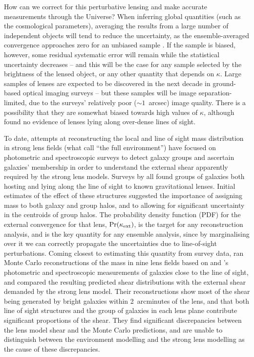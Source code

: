 \documentclass[useAMS,usenatbib]{mn2e}
\begin{document}
How can we correct for this perturbative lensing and make
accurate measurements through the Universe? When inferring global quantities
(such as the cosmological parameters), averaging the results from a large
number of independent objects will tend to reduce the uncertainty, as the
ensemble-averaged convergence approaches zero for an unbiased sample
\citep[\eg][]{Linder+Holz2004}. If the sample is biased, however, some
residual systematic error will remain while the statistical uncertainty
decreases -- and this will be the case for any sample selected by the
brightness of the lensed object, or any other quantity that depends on
$\kappa$. Large
samples of lenses are expected to be discovered in the next decade in
ground-based optical imaging surveys \citep{Oguri+Marshall2010} -- but these
samples will be image separation-limited, due to the surveys' relatively poor
($\sim 1$~arcsec) image quality. There is a possibility that
they are somewhat biased towards high values of $\kappa$, although 
\citet{Fassnacht+Lubin2002}  found no evidence of lenses lying along over-dense lines of sight.


To date, attempts at reconstructing the local and line of sight mass
distribution in strong lens fields (what \citeauthor{WongEtal2011} call ``the
full environment'') have focused on photometric and  spectroscopic surveys to
detect galaxy groups and ascertain galaxies' membership in order to understand
the external shear apparently required by the strong lens models. Surveys by
\citet{Fassnacht+Lubin2002,AugerEtal2007,WilliamsEtal2006,MomchevaEtal2006}
all found groups of galaxies both hosting and lying  along the line of sight
to known gravitational lenses. Initial estimates of the effect of these
structures suggested the importance of assigning mass to both galaxy and group
halos, and to allowing for significant uncertainty in the centroids of group
halos. The probability density function (PDF) for the external convergence for
that lens, $\Pr(\kappa_{\rm ext})$, is the target for any reconstruction analysis, and
is the key quantity for any ensemble analysis, since by marginalising over it
we can correctly propagate the uncertainties due to line-of-sight perturbations. Coming
closest to estimating this quantity from survey data, \citet{WongEtal2011} ran
Monte Carlo reconstructions of the mass in nine lens fields based on
\citeauthor{WilliamsEtal2006} and \citeauthor{MomchevaEtal2006}'s
photometric and spectroscopic measurements of galaxies close to the line of
sight, and compared the resulting predicted shear distributions with the
external shear demanded by the strong lens model. Their reconstructions show most
of the shear being generated by bright galaxies within 2~arcminutes of the
lens, and that both line of sight structures and the group of galaxies in each
lens plane contribute significant proportions of the shear. They find
significant discrepancies between the lens model shear and the Monte Carlo
predictions, and are unable to distinguish between the environment modelling
and the strong lens modelling as the cause of these discrepancies.
\end{document}
